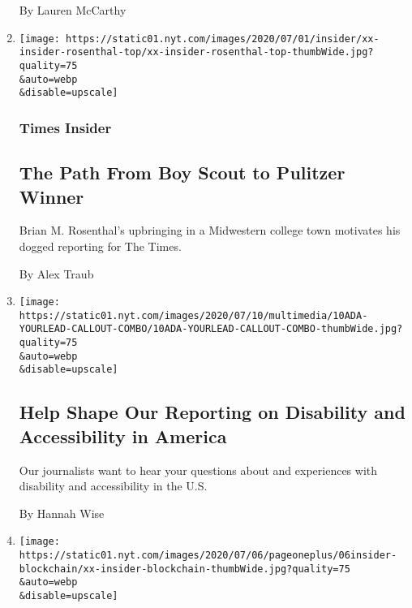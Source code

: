 \begin{enumerate}
  By Lauren McCarthy
\item
  \href{/2020/07/10/insider/brian-rosenthal-pulitzer.html}{}

  \texttt{[image: https://static01.nyt.com/images/2020/07/01/insider/xx-insider-rosenthal-top/xx-insider-rosenthal-top-thumbWide.jpg?quality=75\\\&auto=webp\\\&disable=upscale]}

  \hypertarget{times-insider-9}{%
  \subsubsection{Times Insider}\label{times-insider-9}}

  \hypertarget{the-path-from-boy-scout-to-pulitzer-winner}{%
  \subsection{The Path From Boy Scout to Pulitzer
  Winner}\label{the-path-from-boy-scout-to-pulitzer-winner}}

  Brian M. Rosenthal's upbringing in a Midwestern college town motivates
  his dogged reporting for The Times.

  By Alex Traub
\item
  \href{/2020/07/10/reader-center/disability-america-questions.html}{}

  \texttt{[image: https://static01.nyt.com/images/2020/07/10/multimedia/10ADA-YOURLEAD-CALLOUT-COMBO/10ADA-YOURLEAD-CALLOUT-COMBO-thumbWide.jpg?quality=75\\\&auto=webp\\\&disable=upscale]}

  \hypertarget{help-shape-our-reporting-on-disability-and-accessibility-in-america}{%
  \subsection{Help Shape Our Reporting on Disability and Accessibility
  in
  America}\label{help-shape-our-reporting-on-disability-and-accessibility-in-america}}

  Our journalists want to hear your questions about and experiences with
  disability and accessibility in the U.S.

  By Hannah Wise
\item
  \href{/2020/07/06/insider/could-we-fight-misinformation-with-blockchain-technology.html}{}

  \texttt{[image: https://static01.nyt.com/images/2020/07/06/pageoneplus/06insider-blockchain/xx-insider-blockchain-thumbWide.jpg?quality=75\\\&auto=webp\\\&disable=upscale]}


\end{enumerate}
